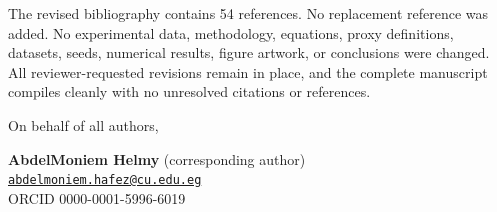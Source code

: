 \documentclass[11pt]{article}
\begin{document}
The revised bibliography contains 54 references. No replacement reference was added. No experimental data, methodology, equations, proxy definitions, datasets, seeds, numerical results, figure artwork, or conclusions were changed. All reviewer-requested revisions remain in place, and the complete manuscript compiles cleanly with no unresolved citations or references.

On behalf of all authors,

\textbf{AbdelMoniem Helmy} (corresponding author)\\
\href{mailto:abdelmoniem.hafez@cu.edu.eg}{\nolinkurl{abdelmoniem.hafez@cu.edu.eg}}\\
ORCID 0000-0001-5996-6019
\end{document}
